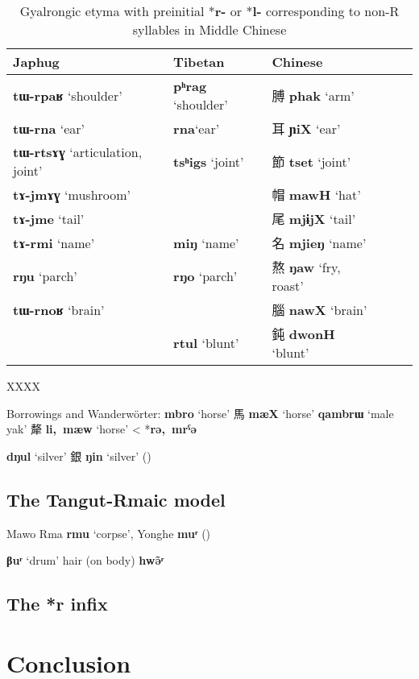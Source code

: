 \documentclass[oneside,a4paper,11pt]{article}
\newcommand{\ipa}[1]{{\phon\mbox{\textbf{#1}}}}
\newcommand{\zh}[1]{{\cn #1}}
\newcommand{\ch}[3]{\zh{#1} \ipa{#2} `#3'}
\begin{document}
\begin{table}
\caption{Gyalrongic etyma with preinitial *\ipa{r-} or *\ipa{l-} corresponding to non-R syllables in Middle Chinese} \label{tab:no.r} \centering
\begin{tabular}{llllll}
\toprule
Japhug & Tibetan & Chinese \\
\midrule
\ipa{tɯ-rpaʁ} `shoulder'& \ipa{pʰrag} `shoulder'& \ch{膊}{phak}{arm} \\
\ipa{tɯ-rna} `ear'& \ipa{rna}`ear' & \ch{耳}{ɲiX}{ear} \\
\ipa{tɯ-rtsɤɣ} `articulation, joint'& \ipa{tsʰigs} `joint'& \ch{節}{tset}{joint} \\
\ipa{tɤ-jmɤɣ} `mushroom' &&\ch{帽}{mawH}{hat} \\
\ipa{tɤ-jme} `tail' &&\ch{尾}{mjɨjX}{tail} \\
\ipa{tɤ-rmi} `name'& \ipa{miŋ} `name'& \ch{名}{mjieŋ}{name} \\ 
\ipa{rŋu} `parch'& \ipa{rŋo} `parch'& \ch{熬}{ŋaw}{fry, roast} \\
\ipa{tɯ-rnoʁ} `brain' && \ch{腦}{nawX}{brain} \\
&\ipa{rtul} `blunt' & \ch{鈍}{dwonH}{blunt} \\
\bottomrule
\end{tabular}
\end{table}
XXXX

Borrowings and Wanderwörter:
\ipa{mbro} `horse' \ch{馬}{mæX}{horse}
\ipa{qambrɯ} `male yak' \ch{犛}{li, mæw}{horse} < *\ipa{rə, mrˁə}

\ipa{dŋul} `silver'  \ch{銀}{ŋin}{silver} (\citealt{antonov12kumush})

\subsection{The Tangut-Rmaic model}
 
 Mawo Rma \ipa{rmu} `corpse', Yonghe \ipa{muʳ} (\citealt[41]{sims14yonghe})

\ipa{βuʳ} `drum'
hair (on body) \ipa{hwə̃ʳ}

\subsection{The *r infix}

 \citet{sagart99roc}


%


 

 

 

\section{Conclusion}




\end{document}
